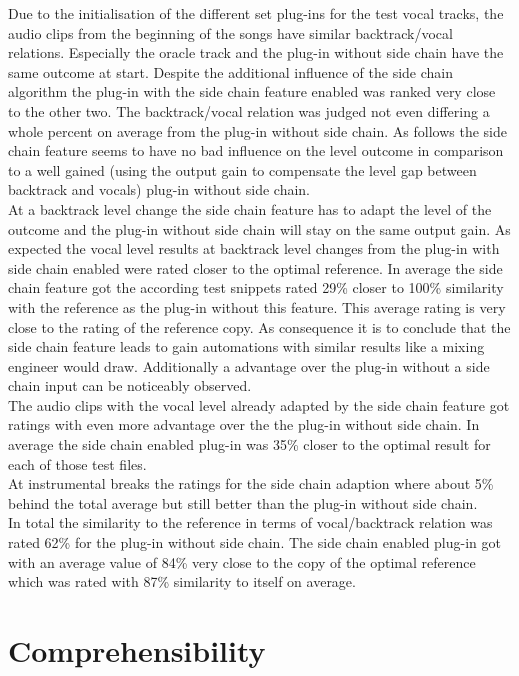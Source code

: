 Due to the initialisation of the different set plug-ins for the test vocal tracks, the audio clips from the beginning of the songs have similar backtrack/vocal relations. Especially the oracle track and the plug-in without side chain have the same outcome at start. Despite the additional influence of the side chain algorithm the plug-in with the side chain feature enabled was ranked very close to the other two. The backtrack/vocal relation was judged not even differing a whole percent on average from the plug-in without side chain. As follows the side chain feature seems to have no bad influence on the level outcome in comparison to a well gained (using the output gain to compensate the level gap between backtrack and vocals) plug-in without side chain.\\
At a backtrack level change the side chain feature has to adapt the level of the outcome and the plug-in without side chain will stay on the same output gain. As expected the vocal level results at backtrack level changes from the plug-in with side chain enabled were rated closer to the optimal reference. In average the side chain feature got the according test snippets rated 29\% closer to 100\% similarity with the reference as the plug-in without this feature. This average rating is very close to the rating of the reference copy. As consequence it is to conclude that the side chain feature leads to gain automations with similar results like a mixing engineer would draw. Additionally a advantage over the plug-in without a side chain input can be noticeably observed.\\
The audio clips with the vocal level already adapted by the side chain feature got ratings with even more advantage over the the plug-in without side chain. In average the side chain enabled plug-in was 35\% closer to the optimal result for each of those test files.\\
At instrumental breaks the ratings for the side chain adaption where about 5\% behind the total average but still better than the plug-in without side chain.\\
In total the similarity to the reference in terms of vocal/backtrack relation was rated 62\% for the plug-in without side chain. The side chain enabled plug-in got with an average value of 84\% very close to the copy of the optimal reference which was rated with 87\% similarity to itself on average.\\

\section{Comprehensibility}


